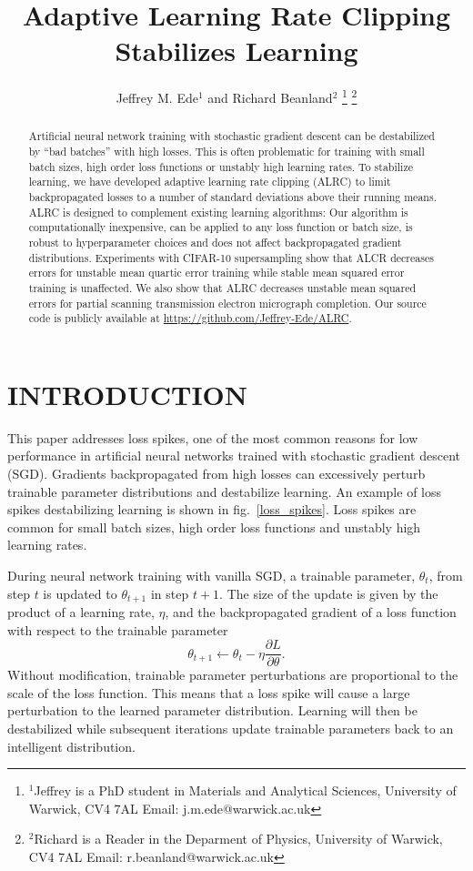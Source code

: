 \documentclass[letterpaper, 10 pt, conference]{ieeeconf}  %
\title{\LARGE \bf
Adaptive Learning Rate Clipping Stabilizes Learning
}
\author{Jeffrey M. Ede$^{1}$ and Richard Beanland$^{2}$%
\thanks{$^{1}$Jeffrey is a PhD student in Materials and Analytical Sciences, 
University of Warwick, CV4 7AL
Email: j.m.ede@warwick.ac.uk}%
\thanks{$^{2}$Richard is a Reader in the Deparment of Physics, 
University of Warwick, CV4 7AL
Email: r.beanland@warwick.ac.uk}%
}
\newcommand*\GitHubLoc{https://github.com/Jeffrey-Ede/ALRC}
\begin{document}
\maketitle
\thispagestyle{empty}
\pagestyle{empty}


\begin{abstract}

Artificial neural network training with stochastic gradient descent can be destabilized by ``bad batches'' with high losses. This is often problematic for training with small batch sizes, high order loss functions or unstably high learning rates. To stabilize learning, we have developed adaptive learning rate clipping (ALRC) to limit backpropagated losses to a number of standard deviations above their running means. ALRC is designed to complement existing learning algorithms: Our algorithm is computationally inexpensive, can be applied to any loss function or batch size, is robust to hyperparameter choices and does not affect backpropagated gradient distributions. Experiments with CIFAR-10 supersampling show that ALCR decreases errors for unstable mean quartic error training while stable mean squared error training is unaffected. We also show that ALRC decreases unstable mean squared errors for partial scanning transmission electron micrograph completion. Our source code is publicly available at \url{\GitHubLoc}.

\end{abstract}

\section{INTRODUCTION}

This paper addresses loss spikes, one of the most common reasons for low performance in artificial neural networks trained with stochastic gradient descent\cite{ruder2016overview} (SGD). Gradients backpropagated from high losses can excessively perturb trainable parameter distributions and destabilize learning. An example of loss spikes destabilizing learning is shown in fig.~\ref{loss_spikes}. Loss spikes are common for small batch sizes, high order loss functions and unstably high learning rates.

During neural network training with vanilla SGD, a trainable parameter, $\theta_t$, from step $t$ is updated to $\theta_{t+1}$ in step $t+1$. The size of the update is given by the product of a learning rate, $\eta$, and the backpropagated gradient of a loss function with respect to the trainable parameter
\begin{equation}
\theta_{t+1} \leftarrow \theta_t - \eta \dfrac{\partial L}{\partial \theta}.
\end{equation}
Without modification, trainable parameter perturbations are proportional to the scale of the loss function. This means that a loss spike will cause a large perturbation to the learned parameter distribution. Learning will then be destabilized while subsequent iterations update trainable parameters back to an intelligent distribution. 
\end{document}
